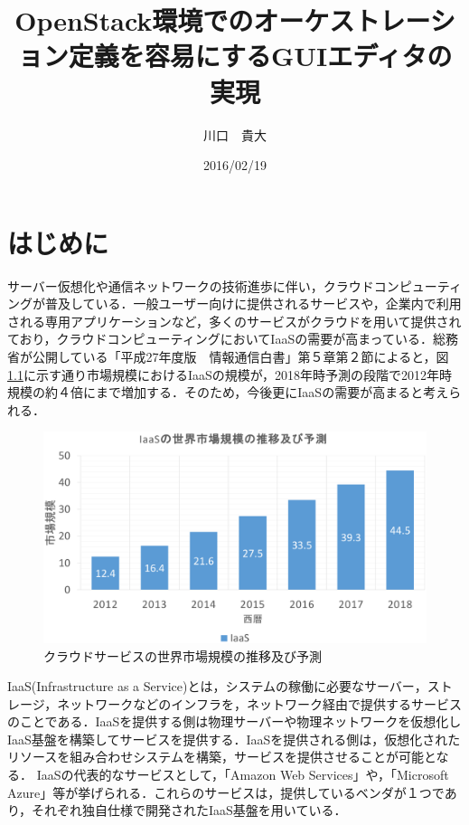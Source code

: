 \documentclass[mingoth]{kut-paper}		%
\title{OpenStack環境でのオーケストレーション定義を容易にするGUIエディタの実現}
\author{川口　貴大}
\date{2016/02/19}
\begin{document}
\maketitle

\chapter{はじめに}
%
	
	サーバー仮想化や通信ネットワークの技術進歩に伴い，クラウドコンピューティングが普及している．一般ユーザー向けに提供されるサービスや，企業内で利用される専用アプリケーションなど，多くのサービスがクラウドを用いて提供されており，クラウドコンピューティングにおいてIaaSの需要が高まっている．総務省が公開している「平成27年度版　情報通信白書」第５章第２節によると，図\ref{graf:1}に示す通り市場規模におけるIaaSの規模が，2018年時予測の段階で2012年時規模の約４倍にまで増加する．\cite{bib:1}そのため，今後更にIaaSの需要が高まると考えられる．
	\begin{figure}[H]
		\begin{center}
			\includegraphics[scale=0.4]{Document/IaaSGrafNew.eps}
			\caption{クラウドサービスの世界市場規模の推移及び予測}
			\label{graf:1}
		\end{center}
	\end{figure}
	
	IaaS(Infrastructure as a Service)とは，システムの稼働に必要なサーバー，ストレージ，ネットワークなどのインフラを，ネットワーク経由で提供するサービスのことである\cite{bib:2}．IaaSを提供する側は物理サーバーや物理ネットワークを仮想化しIaaS基盤を構築してサービスを提供する．IaaSを提供される側は，仮想化されたリソースを組み合わせシステムを構築，サービスを提供させることが可能となる．
	IaaSの代表的なサービスとして，「Amazon Web Services」や，「Microsoft Azure」等が挙げられる．これらのサービスは，提供しているベンダが１つであり，それぞれ独自仕様で開発されたIaaS基盤を用いている．
	
\end{document}
